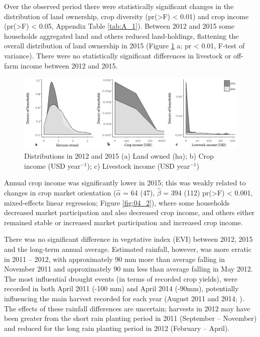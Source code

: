 Over the observed period there were statistically significant changes in the distribution of land ownership, crop diversity (pr(\textgreater{\textbar}F{\textbar}) {\textless} 0.01) and crop income (pr(\textgreater{\textbar}F{\textbar}) {\textless} 0.05, Appendix Table \ref{tab:A_1}). Between 2012 and 2015 some households aggregated land and others reduced land-holdings, flattening the overall distribution of land ownership in 2015 (Figure \ref{fig:04_1} a; pr {\textless} 0.01, F-test of variance). There were no statistically significant differences in livestock or off-farm income between 2012 and 2015.

\begin{figure}[H] %
  \includegraphics[width=1\textwidth]{figs_04/image2.png}
  \captionsetup{singlelinecheck = off, justification=justified}
    \caption{Distributions in 2012 and 2015 (a) Land owned (ha); b) Crop income (USD year$^{-1}$); c) Livestock income (USD year$^{-1}$)}
    \label{fig:04_1}
\end{figure}

Annual crop income was significantly lower in 2015; this was weakly related to changes in crop market orientation ($\hat{\alpha}$ = 64 (47), $\hat{\beta}$ = 394 (112) pr(\textgreater{\textbar}F{\textbar}) {\textless} 0.001, mixed-effects linear regression; Figure \ref{fig:04_2}), where some households decreased market participation and also decreased crop income, and others either remained stable or increased market participation and increased crop income.

There was no significant difference in vegetative index (EVI) between 2012, 2015 and the long-term annual average. Estimated rainfall, however, was more erratic in 2011 -- 2012, with approximately 90 mm more than average falling in November 2011 and approximately 90 mm less than average falling in May 2012. The most influential drought events (in terms of recorded crop yields), were recorded in both April 2011 (-100 mm) and April 2014 (-90mm), potentially influencing the main harvest recorded for each year (August 2011 and 2014; \citealp{Janowiak1999}). The effects of these rainfall differences are uncertain; harvests in 2012 may have been greater from the short rain planting period in 2011 (September -- November) and reduced for the long rain planting period in 2012 (February -- April).

